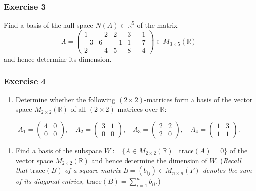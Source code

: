 \documentclass[
  12pt,
  a4paper,
  twoside]{article}
\providecommand{\tightlist}{%
  \setlength{\itemsep}{0pt}\setlength{\parskip}{0pt}}
\theoremstyle{plain}
\theoremstyle{definition}
\begin{document}
\hypertarget{exercise-3-5}{%
\subsubsection*{Exercise 3}\label{exercise-3-5}}

Find a basis of the null space \(N(A) \subset \mathbb{R}^5\) of the matrix
\[
A = \left(\begin{array}{ccccc} 1 & -2 & 2 & 3 & -1\\ -3 & 6 & -1 & 1 & -7\\ 2 &
-4 & 5 & 8 & -4 \end{array}\right) \in M_{3 \times 5}(\mathbb{R})
\]
and hence determine its dimension.

\hypertarget{exercise-4-3}{%
\subsubsection*{Exercise 4}\label{exercise-4-3}}

\begin{enumerate}
\def\labelenumi{(\alph{enumi})}
\tightlist
\item
  Determine whether the following \((2 \times 2)\)-matrices
  form a basis of the vector space \(M_{2 \times 2}(\mathbb{R})\) of all
  \((2 \times 2)\)-matrices over \(\mathbb{R}\):
\end{enumerate}

\[A_1 = \left(\begin{array}{cc} 4 & 0 \\ 0 & 0 \end{array}\right),
\quad A_2 = \left(\begin{array}{cc} 3 & 1 \\ 0 & 0
\end{array}\right), \quad A_3 = \left(\begin{array}{cc} 2 & 2 \\ 2 &
0 \end{array}\right), \quad A_4 = \left(\begin{array}{cc} 1 & 3 \\
1 & 1 \end{array}\right).\]

\begin{enumerate}
\def\labelenumi{(\alph{enumi})}
\setcounter{enumi}{1}
\tightlist
\item
  Find a basis of the subspace \(W:= \{A \in M_{2 \times 2}(\mathbb{R}) \mid \textrm{trace}(A) = 0\}\) of the vector space \(M_{2 \times 2}(\mathbb{R})\) and hence determine the dimension of \(W\).
  (\emph{Recall that \(\textrm{trace}(B)\) of a square matrix \(B=(b_{ij})\in M_{n\times n}(F)\)
  denotes the sum of its diagonal entries, \(\textrm{trace}(B)=\sum_{i=1}^nb_{ii}\).})
\end{enumerate}
\end{document}
